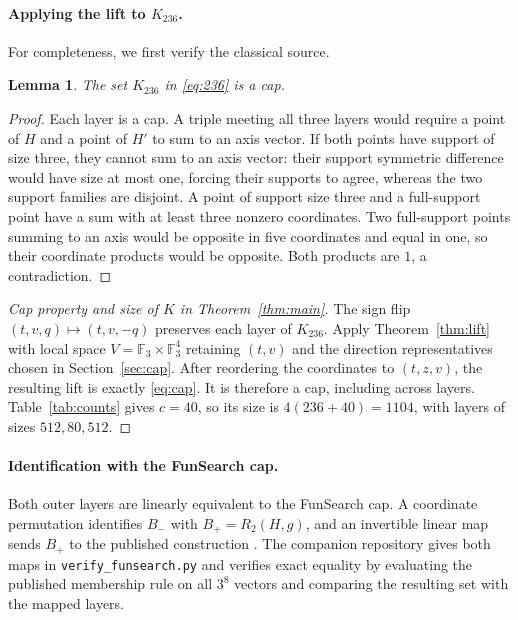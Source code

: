 \documentclass[11pt]{article}
\newcommand{\F}{\mathbb F_3}
\newtheorem{lemma}[theorem]{Lemma}
\begin{document}
\paragraph{Applying the lift to $K_{236}$.}
For completeness, we first verify the classical source.
\begin{lemma}\label{lem:classical}
The set $K_{236}$ in \eqref{eq:236} is a cap.
\end{lemma}
\begin{proof}
Each layer is a cap. A triple meeting all three layers would require
a point of $H$ and a point of $H'$ to sum to an axis vector.
If both points have support of size three, they cannot sum to an axis
vector: their support symmetric difference would have size at most one,
forcing their supports to agree, whereas the two support families are
disjoint. A point of support size three and a full-support point have a
sum with at least three nonzero coordinates.
Two full-support points summing to an axis would be opposite in five
coordinates and equal in one, so their coordinate products would be
opposite. Both products are $1$, a contradiction.
\end{proof}

\begin{proof}[Cap property and size of $K$ in Theorem~\ref{thm:main}]
The sign flip $(t,v,q)\mapsto(t,v,-q)$ preserves each layer of $K_{236}$.
Apply Theorem~\ref{thm:lift} with local space $V=\F\times\F^4$
retaining $(t,v)$ and the direction representatives chosen in
Section~\ref{sec:cap}. After reordering the coordinates to $(t,z,v)$,
the resulting lift is exactly \eqref{eq:cap}. It is therefore a cap,
including across layers. Table~\ref{tab:counts} gives $c=40$, so its size
is $4(236+40)=1104$, with layers of sizes $512,80,512$.
\end{proof}

\paragraph{Identification with the FunSearch cap.}
Both outer layers are linearly equivalent to the FunSearch cap.
A coordinate permutation identifies $B_-$ with $B_+=R_2(H,g)$, and an
invertible linear map sends $B_+$ to the published construction
\cite[Figure 4c and Supplement Figure E.23]{funsearch}.
The companion repository gives both maps in \texttt{verify\_funsearch.py}
and verifies exact equality by evaluating the published membership rule
on all $3^8$ vectors and comparing the resulting set with the mapped layers.
\end{document}
